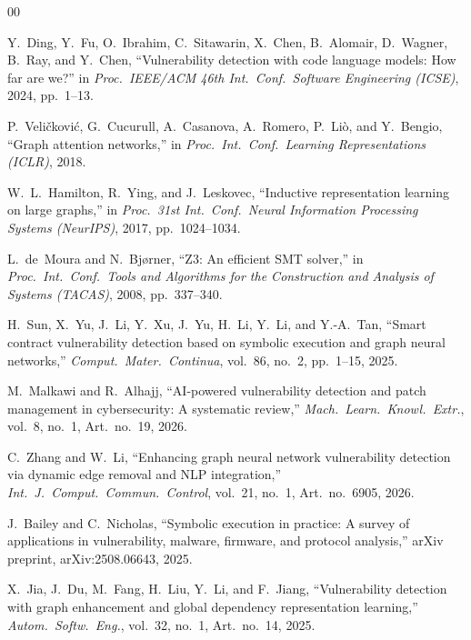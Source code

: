 \documentclass[10pt,conference]{IEEEtran}
\begin{document}
\balance
\footnotesize
\begin{thebibliography}{00}

Y.~Ding, Y.~Fu, O.~Ibrahim, C.~Sitawarin, X.~Chen, B.~Alomair, D.~Wagner, B.~Ray, and Y.~Chen,
``Vulnerability detection with code language models: How far are we?''
in \emph{Proc.\ IEEE/ACM 46th Int.\ Conf.\ Software Engineering (ICSE)}, 2024, pp.~1--13.

P.~Veli\v{c}kovi\'{c}, G.~Cucurull, A.~Casanova, A.~Romero, P.~Li\`{o}, and Y.~Bengio,
``Graph attention networks,''
in \emph{Proc.\ Int.\ Conf.\ Learning Representations (ICLR)}, 2018.

W.~L.~Hamilton, R.~Ying, and J.~Leskovec,
``Inductive representation learning on large graphs,''
in \emph{Proc.\ 31st Int.\ Conf.\ Neural Information Processing Systems (NeurIPS)}, 2017, pp.~1024--1034.

L.~de~Moura and N.~Bj{\o}rner,
``Z3: An efficient SMT solver,''
in \emph{Proc.\ Int.\ Conf.\ Tools and Algorithms for the Construction and Analysis of Systems (TACAS)}, 2008, pp.~337--340.

H.~Sun, X.~Yu, J.~Li, Y.~Xu, J.~Yu, H.~Li, Y.~Li, and Y.-A.~Tan,
``Smart contract vulnerability detection based on symbolic execution and graph neural networks,''
\emph{Comput.\ Mater.\ Continua}, vol.~86, no.~2, pp.~1--15, 2025.

M.~Malkawi and R.~Alhajj,
``AI-powered vulnerability detection and patch management in cybersecurity: A systematic review,''
\emph{Mach.\ Learn.\ Knowl.\ Extr.}, vol.~8, no.~1, Art.\ no.~19, 2026.

C.~Zhang and W.~Li,
``Enhancing graph neural network vulnerability detection via dynamic edge removal and NLP integration,''
\emph{Int.\ J.\ Comput.\ Commun.\ Control}, vol.~21, no.~1, Art.\ no.~6905, 2026.

J.~Bailey and C.~Nicholas,
``Symbolic execution in practice: A survey of applications in vulnerability, malware, firmware, and protocol analysis,''
arXiv preprint, arXiv:2508.06643, 2025.

X.~Jia, J.~Du, M.~Fang, H.~Liu, Y.~Li, and F.~Jiang,
``Vulnerability detection with graph enhancement and global dependency representation learning,''
\emph{Autom.\ Softw.\ Eng.}, vol.~32, no.~1, Art.\ no.~14, 2025.


\end{thebibliography}
\end{document}
